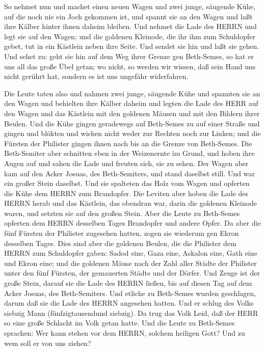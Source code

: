 So nehmet nun und machet einen neuen Wagen und zwei junge,
säugende Kühe, auf die noch nie ein Joch gekommen ist, und spannt sie an
den Wagen und laßt ihre Kälber hinter ihnen daheim bleiben. 
Und nehmet die Lade des HERRN und legt sie auf den Wagen; und die
goldenen Kleinode, die ihr ihm zum Schuldopfer gebet, tut in ein
Kästlein neben ihre Seite. Und sendet sie hin und laßt sie gehen.
 Und sehet zu: geht sie hin auf dem Weg ihrer Grenze gen
Beth-Semes, so hat er uns all das große Übel getan; wo nicht, so werden
wir wissen, daß sein Hand uns nicht gerührt hat, sondern es ist uns
ungefähr widerfahren.

 Die Leute taten also und nahmen zwei junge, säugende Kühe
und spannten sie an den Wagen und behielten ihre Kälber daheim
 und legten die Lade des HERR auf den Wagen und das
Kästlein mit den goldenen Mäusen und mit den Bildern ihrer Beulen.
 Und die Kühe gingen geradewegs auf Beth-Semes zu auf einer
Straße und gingen und blökten und wichen nicht weder zur Rechten noch
zur Linken; und die Fürsten der Philister gingen ihnen nach bis an die
Grenze von Beth-Semes.  Die Beth-Semiter aber schnitten
eben in der Weizenernte im Grund, und hoben ihre Augen auf und sahen die
Lade und freuten sich, sie zu sehen.  Der Wagen aber kam
auf den Acker Josuas, des Beth-Semiters, und stand daselbst still. Und
war ein großer Stein daselbst. Und sie spalteten das Holz vom Wagen und
opferten die Kühe dem HERRN zum Brandopfer.  Die Leviten
aber hoben die Lade des HERRN herab und das Kästlein, das obendran war,
darin die goldenen Kleinode waren, und setzten sie auf den großen Stein.
Aber die Leute zu Beth-Semes opferten dem HERRN desselben Tages
Brandopfer und andere Opfer.  Da aber die fünf Fürsten der
Philister zugesehen hatten, zogen sie wiederum gen Ekron desselben
Tages.  Dies sind aber die goldenen Beulen, die die
Philister dem HERRN zum Schuldopfer gaben: Sadod eine, Gaza eine,
Askalon eine, Gath eine und Ekron eine;  und die goldenen
Mäuse nach der Zahl aller Städte der Philister unter den fünf Fürsten,
der gemauerten Städte und der Dörfer. Und Zeuge ist der große Stein,
darauf sie die Lade des HERRN ließen, bis auf diesen Tag auf dem Acker
Josuas, des Beth-Semiters.  Und etliche zu Beth-Semes
wurden geschlagen, darum daß sie die Lade des HERRN angesehen hatten.
Und er schlug des Volks siebzig Mann (fünfzigtausendund siebzig). Da
trug das Volk Leid, daß der HERR so eine große Schlacht im Volk getan
hatte.  Und die Leute zu Beth-Semes sprachen: Wer kann
stehen vor dem HERRN, solchem heiligen Gott? Und zu wem soll er von uns
ziehen?

